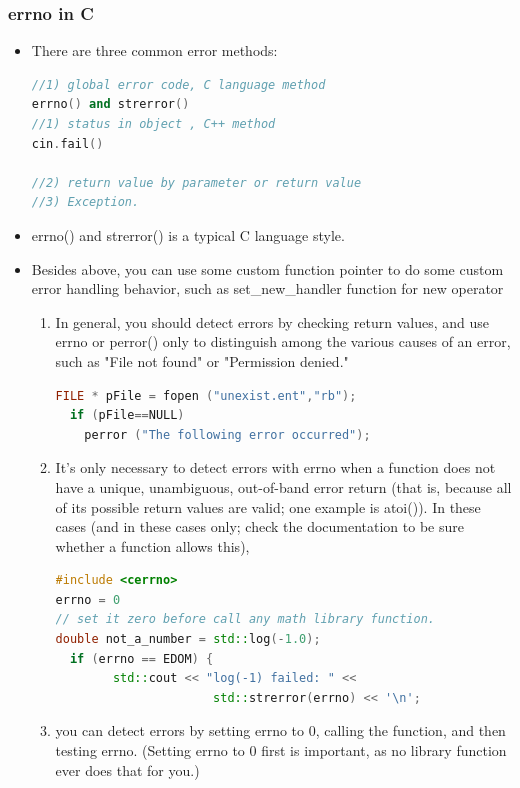 \documentclass[a4paper,12pt,twoside]{book}
\begin{document}
\subsubsection{errno in C}
\begin{itemize}

\item There are three common error methods:
\begin{lstlisting}[frame=single, language=c++]
//1) global error code, C language method
errno() and strerror()
//1) status in object , C++ method
cin.fail()

//2) return value by parameter or return value
//3) Exception.
\end{lstlisting}

\item errno() and strerror() is a typical C language style.


\item Besides above, you can use some custom function pointer to do some custom error handling behavior, such as set\_new\_handler function for new operator

\begin{enumerate}
\item In general, you should detect errors by checking return values, and use errno or perror() only to distinguish among the various causes of an error, such as "File not found" or "Permission denied."

\begin{lstlisting}[frame=single, language=c++]
FILE * pFile = fopen ("unexist.ent","rb");
  if (pFile==NULL)
    perror ("The following error occurred");
\end{lstlisting}

\item It's only necessary to detect errors with errno when a function does not have a unique, unambiguous, out-of-band error return (that is, because all of its possible return values are valid; one example is atoi()). In these cases (and in these cases only; check the documentation to be sure whether a function allows this),
\begin{lstlisting}[frame=single, language=c++]
#include <cerrno>
errno = 0
// set it zero before call any math library function.
double not_a_number = std::log(-1.0);
  if (errno == EDOM) {
        std::cout << "log(-1) failed: " <<
                      std::strerror(errno) << '\n';
\end{lstlisting}
\item you can detect errors by setting errno to 0, calling the function, and then testing errno. (Setting errno to 0 first is important, as no library function ever does that for you.)
\end{enumerate}


\end{itemize}
\end{document}
